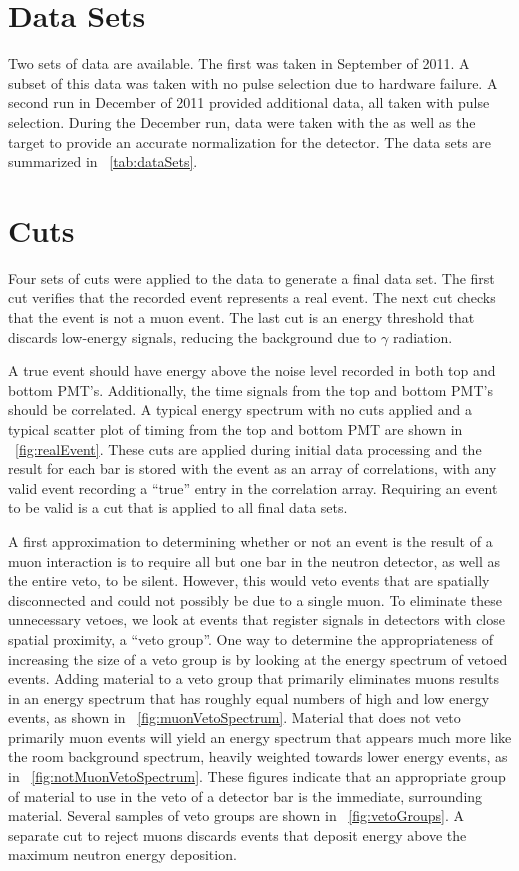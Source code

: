 \section{Data Sets}
Two sets of \reaction data are available.  The first was taken in September of 2011.  A subset of this data was taken with no pulse selection due to hardware failure.  A second run in December of 2011 provided additional data, all taken with pulse selection.  During the December run, data were taken with the \GeTargets as well as the  target to provide an accurate normalization for the detector.  The data sets are summarized in {\tab}~\ref{tab:dataSets}.

\section{Cuts}
\label{sec:cuts}
Four sets of cuts were applied to the data to generate a final data set.  The first cut verifies that the recorded event represents a real event.  The next cut checks that the event is not a muon event.  The last cut is an energy threshold that discards low-energy signals, reducing the background due to $\gamma$ radiation.

A true event should have energy above the noise level recorded in both top and bottom PMT's.  Additionally, the time signals from the top and bottom PMT's should be correlated.  A typical energy spectrum with no cuts applied and a typical scatter plot of timing from the top and bottom PMT are shown in {\fig}~\ref{fig:realEvent}.  These cuts are applied during initial data processing and the result for each bar is stored with the event as an array of correlations, with any valid event recording a ``true'' entry in the correlation array.  Requiring an event to be valid is a cut that is applied to all final data sets.

A first approximation to determining whether or not an event is the result of a muon interaction is to require all but one bar in the neutron detector, as well as the entire veto, to be silent.  However, this would veto events that are spatially disconnected and could not possibly be due to a single muon.  To eliminate these unnecessary vetoes, we look at events that register signals in detectors with close spatial proximity, a ``veto group''.  One way to determine the appropriateness of increasing the size of a veto group is by looking at the energy spectrum of vetoed events.  Adding material to a veto group that primarily eliminates muons results in an energy spectrum that has roughly equal numbers of high and low energy events, as shown in {\fig}~\ref{fig:muonVetoSpectrum}.  Material that does not veto primarily muon events will yield an energy spectrum that appears much more like the room background spectrum, heavily weighted towards lower energy events, as in {\fig}~\ref{fig:notMuonVetoSpectrum}.  These figures indicate that an appropriate group of material to use in the veto of a detector bar is the immediate, surrounding material.  Several samples of veto groups are shown in {\fig}~\ref{fig:vetoGroups}.  A separate cut to reject muons discards events that deposit energy above the maximum neutron energy deposition.    

